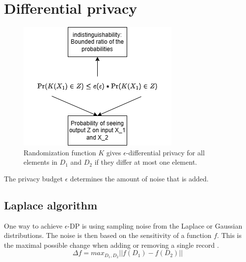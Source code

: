 
\section{Differential privacy} \label{section:dp}
\glsaddall
\leading{10pt}
\printglossary[type=differential-privacy, nonumberlist]
\begin{figure}[h]
  \includegraphics{TheorethicalFramework/Differential privacy/master-thesis-Differential privacy illustration.png}
  \caption{Randomization function $K$ gives $\epsilon$-differential privacy for all elements in $D_1$ and $D_2$ if they differ at most one element. \citep{dwork_differential_2006}}
  \label{fig:definition-dp}
\end{figure}
The privacy budget $\epsilon$ determines the amount of noise that is added.
\subsection{Laplace algorithm}
One way to achieve $\epsilon$-DP is using sampling noise from the Laplace or Gaussian distributions.
The noise is then based on the sensitivity of a function $f$.
This is the maximal possible change when adding or removing a single record \citep{friedman_data_2010, dwork_differential_2006}.
\begin{equation}
  \Delta f = max_{D_1, D_2} ||f(D_1) - f(D_2)||
\end{equation}



